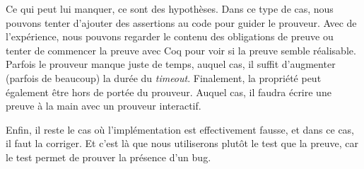 Ce qui peut lui manquer, ce sont des hypothèses. Dans ce type de cas, nous
pouvons tenter d'ajouter des assertions au code pour guider le prouveur. Avec
de l'expérience, nous pouvons regarder le contenu des obligations de preuve ou 
tenter de commencer la preuve avec Coq pour voir si la preuve semble réalisable. 
Parfois le prouveur manque juste de temps, auquel cas, il suffit d'augmenter 
(parfois de beaucoup) la durée du \textit{timeout}. Finalement, la propriété peut 
également être hors de portée du prouveur. Auquel cas, il faudra écrire une
preuve à la main avec un prouveur interactif.



Enfin, il reste le cas où l'implémentation est effectivement fausse, et dans ce
cas, il faut la corriger. Et c'est là que nous utiliserons plutôt le test que la
preuve, car le test permet de prouver la présence d'un bug.

